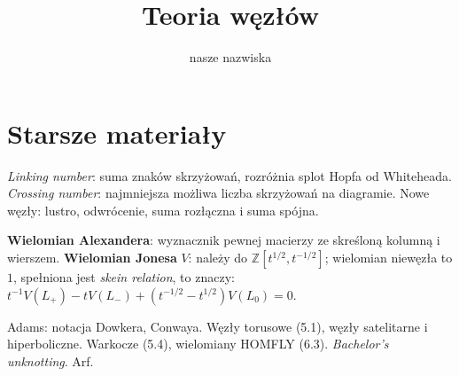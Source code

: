 \documentclass[a4paper, fleqn]{extarticle}
\title{Teoria węzłów}
\author{nasze nazwiska}
\numberwithin{dummy}{section}
\begin{document}
\maketitle
\tableofcontents





%



\newpage

\raggedright

\section*{Starsze materiały}

\emph{Linking number}: suma znaków skrzyżowań, rozróżnia splot Hopfa od Whiteheada.
\emph{Crossing number}: najmniejsza możliwa liczba skrzyżowań na diagramie.
Nowe węzły: lustro, odwrócenie, suma rozłączna i suma spójna.

\textbf{Wielomian Alexandera}: wyznacznik pewnej macierzy ze skreśloną kolumną i wierszem.
\textbf{Wielomian Jonesa} $V$: należy do $\mathbb Z[t^{1/2}, t^{-1/2}]$; wielomian niewęzła to $1$, spełniona jest \emph{skein relation}, to znaczy: $t^{-1}V(L_+)-tV(L_-)+(t^{-1/2}-t^{1/2})V(L_0)=0$.

Adams: notacja Dowkera, Conwaya. Węzły torusowe (5.1), węzły satelitarne i hiperboliczne.
Warkocze (5.4), wielomiany HOMFLY (6.3).
\emph{Bachelor's unknotting}.
Arf.
\end{document}
